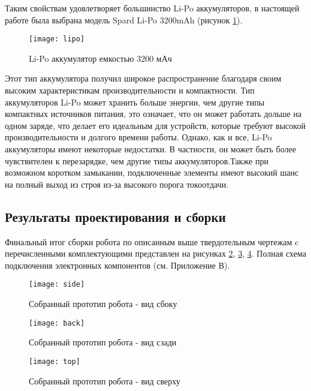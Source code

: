 Таким свойствам удовлетворяет большинство Li-Po аккумуляторов, в настоящей работе была выбрана модель Spard Li-Po 3200mAh (рисунок \ref{lipo}).
\begin{figure}[h!]
	\begin{center}
		\texttt{[image: lipo]}
		\caption{Li-Po аккумулятор емкостью 3200 мАч}
		\label{lipo}
	\end{center}
\end{figure}
Этот тип аккумулятора получил широкое распространение благодаря своим высоким характеристикам производительности и компактности. Тип аккумуляторов Li-Po может хранить больше энергии, чем другие типы компактных источников питания, это означает, что он может работать дольше на одном заряде, что делает его идеальным для устройств, которые требуют высокой производительности и долгого времени работы. Однако, как и все, Li-Po аккумуляторы имеют некоторые недостатки. В частности, он может быть более чувствителен к перезарядке, чем другие типы аккумуляторов.Также при возможном коротком замыкании, подключенные элементы имеют высокий шанс на полный выход из строя из-за высокого порога токоотдачи. 

\subsection{Результаты проектирования и сборки}\label{C4_4_5}

Финальный итог сборки робота по описанным выше твердотельным чертежам c перечисленными комплектующими представлен на  рисунках \ref{side}, \ref{back}, \ref{top}. Полная схема подключения электронных компонентов (см. Приложение В).
\newpage
\begin{figure}[h!]
	\begin{center}
		\texttt{[image: side]}
		\caption{Собранный прототип робота - вид сбоку}
		\label{side}
	\end{center}
\end{figure}

\begin{figure}[h!]
	\begin{center}
		\texttt{[image: back]}
		\caption{Собранный прототип робота - вид сзади}
		\label{back}
	\end{center}
\end{figure}
\newpage
\begin{figure}[h!]
	\begin{center}
		\texttt{[image: top]}
		\caption{Собранный прототип робота - вид сверху}
		\label{top}
	\end{center}
\end{figure}